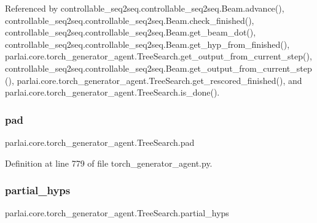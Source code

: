 Referenced by controllable\+\_\+seq2seq.\+controllable\+\_\+seq2seq.\+Beam.\+advance(), controllable\+\_\+seq2seq.\+controllable\+\_\+seq2seq.\+Beam.\+check\+\_\+finished(), controllable\+\_\+seq2seq.\+controllable\+\_\+seq2seq.\+Beam.\+get\+\_\+beam\+\_\+dot(), controllable\+\_\+seq2seq.\+controllable\+\_\+seq2seq.\+Beam.\+get\+\_\+hyp\+\_\+from\+\_\+finished(), parlai.\+core.\+torch\+\_\+generator\+\_\+agent.\+Tree\+Search.\+get\+\_\+output\+\_\+from\+\_\+current\+\_\+step(), controllable\+\_\+seq2seq.\+controllable\+\_\+seq2seq.\+Beam.\+get\+\_\+output\+\_\+from\+\_\+current\+\_\+step(), parlai.\+core.\+torch\+\_\+generator\+\_\+agent.\+Tree\+Search.\+get\+\_\+rescored\+\_\+finished(), and parlai.\+core.\+torch\+\_\+generator\+\_\+agent.\+Tree\+Search.\+is\+\_\+done().

\mbox{\label{classparlai_1_1core_1_1torch__generator__agent_1_1TreeSearch_aa00f03954e2bf737b13d1b43a609fb00}} 
\subsubsection{\texorpdfstring{pad}{pad}}
{\footnotesize\ttfamily parlai.\+core.\+torch\+\_\+generator\+\_\+agent.\+Tree\+Search.\+pad}



Definition at line 779 of file torch\+\_\+generator\+\_\+agent.\+py.

\mbox{\label{classparlai_1_1core_1_1torch__generator__agent_1_1TreeSearch_a159f5589fdfea9a040c4c1ca5c14ea2c}} 
\subsubsection{\texorpdfstring{partial\+\_\+hyps}{partial\_hyps}}
{\footnotesize\ttfamily parlai.\+core.\+torch\+\_\+generator\+\_\+agent.\+Tree\+Search.\+partial\+\_\+hyps}



